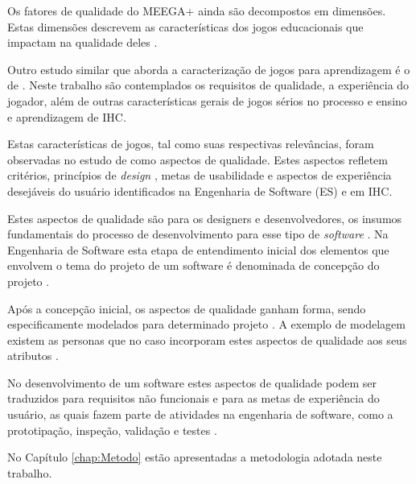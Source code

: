 Os fatores de qualidade do MEEGA+ ainda são decompostos em dimensões. Estas dimensões descrevem as características dos jogos educacionais que impactam na qualidade deles \cite{Petri_Wangenheim_2019}.

Outro estudo similar que aborda a caracterização de jogos para aprendizagem é o de . Neste trabalho são contemplados os requisitos de qualidade, a experiência do jogador, além de outras características gerais de jogos sérios no processo e ensino e aprendizagem de IHC. 

Estas características de jogos, tal como suas respectivas relevâncias, foram observadas no estudo de  como aspectos de qualidade. Estes aspectos refletem critérios, princípios de \textit{design} \cite{nielsen1994, ISO9126-1, BarbosaEtAl2021}, metas de usabilidade e aspectos de experiência desejáveis do usuário \cite{Preece_Rogers_Sharp_2005} identificados na Engenharia de Software (ES) e em IHC.

Estes aspectos de qualidade são para os designers e desenvolvedores, os insumos fundamentais do processo de desenvolvimento para esse tipo de \textit{software} \cite{silva_sales_mendes2021}. Na Engenharia de Software esta etapa de entendimento inicial dos elementos que envolvem o tema do projeto de um software é denominada de concepção do projeto \cite[p. 127]{Pressman_2000}.

Após a concepção inicial, os aspectos de qualidade ganham forma, sendo especificamente modelados para determinado projeto \cite[p. 151]{BarbosaEtAl2021}. A exemplo de modelagem existem as personas que no caso incorporam estes aspectos de qualidade aos seus atributos \cite[p. 154]{BarbosaEtAl2021}.

No desenvolvimento de um software estes aspectos de qualidade podem ser traduzidos para requisitos não funcionais \cite{swebok2014} e para as metas de experiência do usuário, as quais fazem parte de atividades na engenharia de software, como a prototipação, inspeção, validação e testes \cite{Pressman_2000}.





No Capítulo \ref{chap:Metodo} estão apresentadas a metodologia adotada neste trabalho.